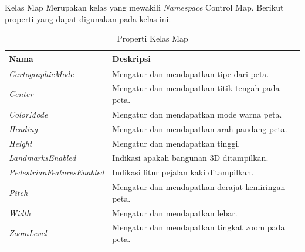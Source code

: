 \hspace{0.5cm} Kelas Map Merupakan kelas yang mewakili \textit{Namespace} Control Map. Berikut properti yang dapat digunakan pada kelas ini.
\begin{table}[h]
	\centering
		\begin{tabular}{ |p{}|p{}|}
				\hline
					Nama & Deskripsi \\ \hline
					\textit{CartographicMode} & Mengatur dan mendapatkan tipe dari peta. \\ \hline
					\textit{Center} & Mengatur dan mendapatkan titik tengah pada peta. \\ \hline
					\textit{ColorMode} & Mengatur dan mendapatkan mode warna peta. \\ \hline
					\textit{Heading} & Mengatur dan mendapatkan arah pandang peta. \\ \hline
					\textit{Height} & Mengatur dan mendapatkan tinggi. \\ \hline
					\textit{LandmarksEnabled} & Indikasi apakah bangunan 3D ditampilkan. \\ \hline
					\textit{PedestrianFeaturesEnabled} & Indikasi fitur pejalan kaki ditampilkan. \\ \hline
					\textit{Pitch} & Mengatur dan mendapatkan derajat kemiringan peta. \\ \hline
					\textit{Width} & Mengatur dan mendapatkan lebar. \\ \hline
					\textit{ZoomLevel} & Mengatur dan mendapatkan tingkat zoom pada peta. \\ \hline
				\hline
		\end{tabular}
	\caption{Properti Kelas Map}
	\label{tab:PropertiKelasMap}
\end{table}

